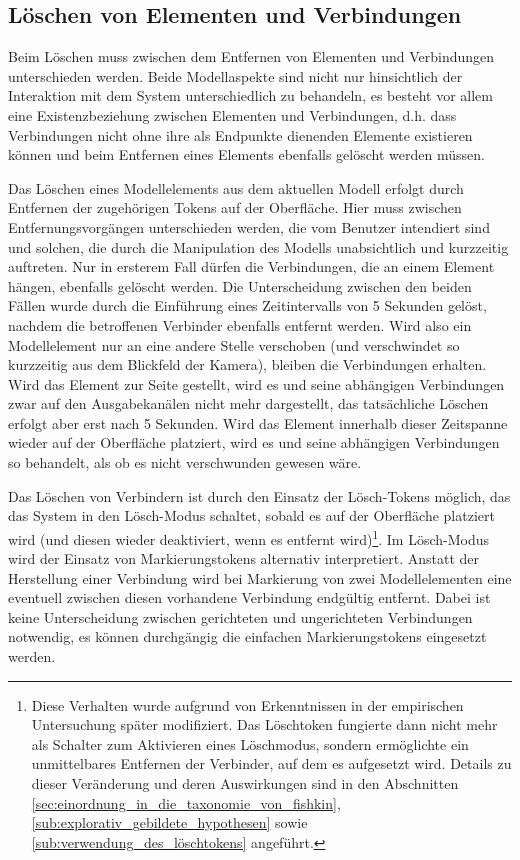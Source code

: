 \subsection{Löschen von Elementen und Verbindungen} %
\label{sub:löschen_von_elementen}

Beim Löschen muss zwischen dem Entfernen von Elementen und Verbindungen unterschieden werden. Beide Modellaspekte sind nicht nur hinsichtlich der Interaktion mit dem System unterschiedlich zu behandeln, es besteht vor allem eine Existenzbeziehung zwischen Elementen und Verbindungen, d.h. dass Verbindungen nicht ohne ihre als Endpunkte dienenden Elemente existieren können und beim Entfernen eines Elements ebenfalls gelöscht werden müssen.

Das Löschen eines Modellelements aus dem aktuellen Modell erfolgt durch Entfernen der zugehörigen Tokens auf der Oberfläche. Hier muss zwischen Entfernungsvorgängen unterschieden werden, die vom Benutzer intendiert sind und solchen, die durch die Manipulation des Modells unabsichtlich und kurzzeitig auftreten. Nur in ersterem Fall dürfen die Verbindungen, die an einem Element hängen, ebenfalls gelöscht werden. Die Unterscheidung zwischen den beiden Fällen wurde durch die Einführung eines Zeitintervalls von 5 Sekunden gelöst, nachdem die betroffenen Verbinder ebenfalls entfernt werden. Wird also ein Modellelement nur an eine andere Stelle verschoben (und verschwindet so kurzzeitig aus dem Blickfeld der Kamera), bleiben die Verbindungen erhalten. Wird das Element zur Seite gestellt, wird es und seine abhängigen Verbindungen zwar auf den Ausgabekanälen nicht mehr dargestellt, das tatsächliche Löschen erfolgt aber erst nach 5 Sekunden. Wird das Element innerhalb dieser Zeitspanne wieder auf der Oberfläche platziert, wird es und seine abhängigen Verbindungen so behandelt, als ob es nicht verschwunden gewesen wäre.

Das Löschen von Verbindern ist durch den Einsatz der Lösch-Tokens möglich, das das System in den Lösch-Modus schaltet, sobald es auf der Oberfläche platziert wird (und diesen wieder deaktiviert, wenn es entfernt wird)\footnote{Diese Verhalten wurde aufgrund von Erkenntnissen in der empirischen Untersuchung später modifiziert. Das Löschtoken fungierte dann nicht mehr als Schalter zum Aktivieren eines Löschmodus, sondern ermöglichte ein unmittelbares Entfernen der Verbinder, auf dem es aufgesetzt wird. Details zu dieser Veränderung und deren Auswirkungen sind in den Abschnitten \ref{sec:einordnung_in_die_taxonomie_von_fishkin}, \ref{sub:explorativ_gebildete_hypothesen} sowie \ref{sub:verwendung_des_löschtokens} angeführt.}. Im Lösch-Modus wird der Einsatz von Markierungstokens alternativ interpretiert. Anstatt der Herstellung einer Verbindung wird bei Markierung von zwei Modellelementen eine eventuell zwischen diesen vorhandene Verbindung endgültig entfernt. Dabei ist keine Unterscheidung zwischen gerichteten und ungerichteten Verbindungen notwendig, es können durchgängig die einfachen Markierungstokens eingesetzt werden.

